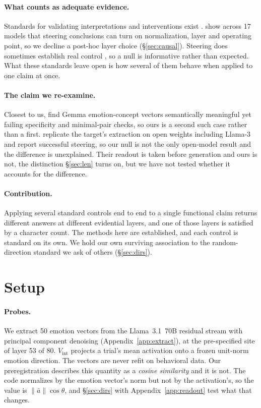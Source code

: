 \documentclass{article}
\begin{document}
\paragraph{What counts as adequate evidence.} Standards for validating interpretations and interventions exist
\citep{palumbo2025axiomatic, mueller2025mib, stoehr2024scaling}.
\citet{wu2026steerable} show across 17 models that steering conclusions can turn
on normalization, layer and operating point, so we decline a post-hoc layer choice
(\S\ref{sec:causal}). Steering does sometimes
establish real control \citep{rimsky2024caa, arditi2024refusal}, so a null is
informative rather than expected. What these standards leave open is how several of them behave when applied to one
claim at once.

\paragraph{The claim we re-examine.} Closest to us, \citet{fomin2026internal} find
Gemma emotion-concept vectors semantically meaningful yet failing specificity and
minimal-pair checks, so ours is a second such case rather than a first.
\citet{gozukara2026emovecllm} replicate the target's extraction on open weights
including Llama-3 and report successful steering, so our null is not the only
open-model result and the difference is unexplained. Their readout is taken before generation and ours is not, the distinction
\S\ref{sec:len} turns on, but we have not tested whether it accounts for the
difference.

\paragraph{Contribution.} Applying several standard controls end to end to a
single functional claim returns different answers at different evidential layers,
and one of those layers is satisfied by a character count. The methods here are
established, and each control is standard on its own. We hold our own surviving association to the random-direction standard we ask of
others (\S\ref{sec:dirs}).

\section{Setup}
\label{sec:setup}

\paragraph{Probes.} We extract 50 emotion vectors from the Llama~3.1~70B residual
stream with principal component denoising (Appendix~\ref{app:extract}), at the pre-specified site
of layer 53 of 80.
$V_{\text{int}}$ projects a trial's mean activation onto a frozen unit-norm emotion
direction. The vectors are never refit on behavioral data. Our preregistration describes this quantity as a \emph{cosine similarity} and it is
not. The code normalizes by the emotion vector's norm but not by the activation's,
so the value is $\lVert \bar a \rVert \cos\theta$, and \S\ref{sec:dirs} with
Appendix~\ref{app:readout} test what that changes.
\end{document}
